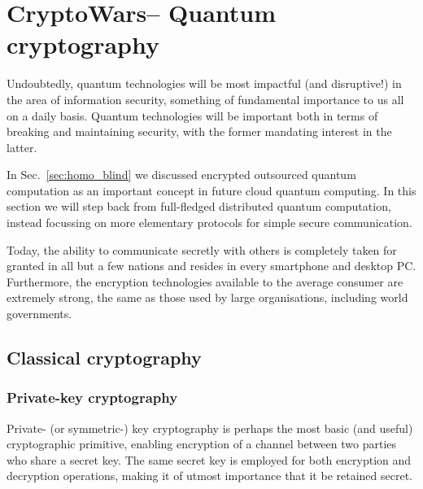 %
%

\section{CryptoWars\texttrademark -- Quantum cryptography}\label{sec:cryptowars}



Undoubtedly, quantum technologies will be most impactful (and disruptive!) in the area of information security, something of fundamental importance to us all on a daily basis. Quantum technologies will be important both in terms of breaking and maintaining security, with the former mandating interest in the latter.

In Sec.~\ref{sec:homo_blind} we discussed encrypted outsourced quantum computation as an important concept in future cloud quantum computing. In this section we will step back from full-fledged distributed quantum computation, instead focussing on more elementary protocols for simple secure communication.

Today, the ability to communicate secretly with others is completely taken for granted in all but a few nations and resides in every smartphone and desktop PC. Furthermore, the encryption technologies available to the average consumer are extremely strong, the same as those used by large organisations, including world governments.

\subsection{Classical cryptography}

\subsubsection{Private-key cryptography}

Private- (or symmetric-) key cryptography is perhaps the most basic (and useful) cryptographic primitive, enabling encryption of a channel between two parties who share a secret key. The same secret key is employed for both encryption and decryption operations, making it of utmost importance that it be retained secret.

